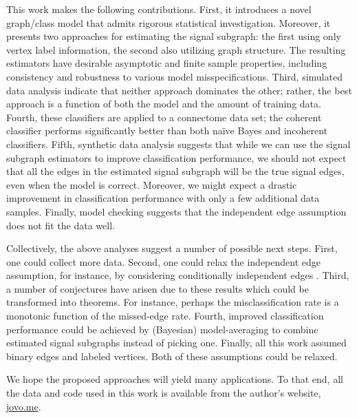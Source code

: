 \documentclass[10pt,journal,cspaper,compsoc]{IEEEtran}
\begin{document}
This work makes the following contributions. First, it introduces a novel graph/class model that admits rigorous statistical investigation.  Moreover, it presents two approaches for estimating the signal subgraph: the first using only vertex label information, the second also utilizing graph structure.  The resulting estimators have desirable asymptotic and finite sample properties, including consistency and robustness to various model misspecifications.  Third, simulated data analysis indicate that neither approach dominates the other; rather, the best approach is a function of both the model and the amount of training data. Fourth, these classifiers are applied to a connectome data set; the coherent classifier performs significantly better than both na\"ive Bayes and incoherent classifiers.  Fifth, synthetic data analysis suggests that while we can use the signal subgraph estimators to improve classification performance, we should not expect that all the edges in the estimated signal subgraph will be the true signal edges, even when the model is correct. Moreover, we might expect a drastic improvement in classification performance with only a few additional data samples.  Finally, model checking suggests that the independent edge assumption does not fit the data well.  

Collectively, the above analyses suggest a number of possible next steps.  First, one could collect more data.  Second, one could relax the independent edge assumption, for instance, by considering conditionally independent edges \cite{Hoff02}.  Third, a number of conjectures have arisen due to these results which could be transformed into theorems.   For instance, perhaps the misclassification rate is a monotonic function of the missed-edge rate.  Fourth, improved classification performance could be achieved by (Bayesian) model-averaging to combine estimated signal subgraphs instead of picking one.  Finally, all this work assumed binary edges and labeled vertices.  Both of these assumptions could be relaxed. 

We hope the proposed approaches will yield many applications.  To that end, all the data and code used in this work is available from the author's website, \url{jovo.me}.  

% 
% 
% 
\end{document}
